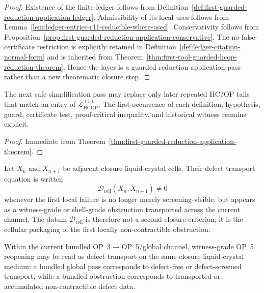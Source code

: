 \begin{proof}
Existence of the finite ledger follows from Definition~\ref{def:first-guarded-reduction-application-ledger}. Admissibility of its local uses follows from Lemma~\ref{lem:ledger-entries-r11-reducible-where-used}. Conservativity follows from Proposition~\ref{prop:first-guarded-reduction-application-conservative}. The no-false-certificate restriction is explicitly retained in Definition~\ref{def:ledger-citation-normal-form} and is inherited from Theorem~\ref{thm:first-tool-guarded-hcop-reduction-theorem}. Hence the layer is a guarded reduction application pass rather than a new theorematic closure step.
\end{proof}

\begin{corollary}
\label{cor:v3340-r12-working-rule}
The next safe simplification pass may replace only later repeated HC/OP tails that match an entry of \(\mathcal L_{\mathrm{HCOP}}^{(1)}\). The first occurrence of each definition, hypothesis, guard, certificate test, proof-critical inequality, and historical witness remains explicit.
\end{corollary}

\begin{proof}
Immediate from Theorem~\ref{thm:first-guarded-reduction-application-theorem}.
\end{proof}

\begin{definition}
\label{def:defect-transport-equation}
Let $X_n$ and $X_{n+1}$ be adjacent closure-liquid-crystal cells. Their defect transport equation is written
\[
 \mathcal D_{\mathrm{cell}}(X_n,X_{n+1})\neq 0
\]
whenever the first local failure is no longer merely screening-visible, but appears as a witness-grade or shell-grade obstruction transported across the current channel. The datum $\mathcal D_{\mathrm{cell}}$ is therefore not a second closure criterion; it is the cellular packaging of the first locally non-contractible obstruction.
\end{definition}

\begin{proposition}
\label{prop:op5-defect-transport-reading}
Within the current bundled OP~3$\to$OP~5/global channel, witness-grade OP~5 reopening may be read as defect transport on the same closure-liquid-crystal medium: a bundled global pass corresponds to defect-free or defect-screened transport, while a bundled obstruction corresponds to transported or accumulated non-contractible defect data.
\end{proposition}

